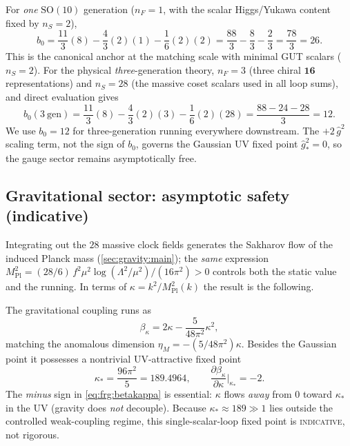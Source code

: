 \begin{remark}
\label{rem:frg:b0}
For \emph{one} $\mathrm{SO}(10)$ generation ($n_{F}=1$, with the scalar
Higgs/Yukawa content fixed by $n_{S}=2$),
\begin{equation}\label{eq:frg:b0one}
  b_{0}
  =\frac{11}{3}(8)-\frac43(2)(1)-\frac16(2)(2)
  =\frac{88}{3}-\frac{8}{3}-\frac{2}{3}
  =\frac{78}{3}=26 .
\end{equation}
This is the canonical anchor at the matching scale with minimal GUT scalars
($n_{S}=2$). For the physical \emph{three}-generation theory, $n_{F}=3$
(three chiral $\mathbf{16}$ representations) and $n_{S}=28$ (the massive
coset scalars used in all loop sums), and direct evaluation gives
\begin{equation}\label{eq:frg:b0three}
  b_{0}(3\ \text{gen})
  =\frac{11}{3}(8)-\frac43(2)(3)-\frac16(2)(28)
  =\frac{88-24-28}{3}=12 .
\end{equation}
We use $b_{0}=12$ for three-generation running everywhere downstream. The
$+2\,\hat g^{2}$ scaling term, not the sign of $b_{0}$, governs the Gaussian
UV fixed point $\hat g^{2}_{\ast}=0$, so the gauge sector remains
asymptotically free.
\end{remark}

\subsection{Gravitational sector: asymptotic safety (indicative)}
\label{sec:frg:gravity}

Integrating out the $28$ massive clock fields generates the Sakharov flow
of the induced Planck mass (\autoref{sec:gravity:main}); the \emph{same}
expression $M_{\mathrm{Pl}}^{2}=(28/6)\,f^{2}\mu^{2}\log(\Lambda^{2}/\mu^{2})/(16\pi^{2})>0$
controls both the static value and the running. In terms of
$\kappa=k^{2}/M_{\mathrm{Pl}}^{2}(k)$ the result is the following.

\begin{conjecture}
\label{conj:frg:gravity}
The gravitational coupling runs as
\begin{equation}\label{eq:frg:betakappa}
  \beta_{\kappa}=2\kappa-\frac{5}{48\pi^{2}}\kappa^{2},
\end{equation}
matching the anomalous dimension $\eta_{M}=-(5/48\pi^{2})\kappa$. Besides
the Gaussian point it possesses a nontrivial UV-attractive fixed point
\begin{equation}\label{eq:frg:kappastar}
  \kappa_{\ast}=\frac{96\pi^{2}}{5}=189.4964,
  \qquad
  \frac{\partial\beta_{\kappa}}{\partial\kappa}\bigg|_{\kappa_{\ast}}=-2 .
\end{equation}
The \emph{minus} sign in \eqref{eq:frg:betakappa} is essential: $\kappa$
flows \emph{away} from $0$ toward $\kappa_{\ast}$ in the UV (gravity does
\emph{not} decouple). Because $\kappa_{\ast}\approx189\gg1$ lies outside
the controlled weak-coupling regime, this single-scalar-loop fixed point is
\textsc{indicative}, not rigorous.
\end{conjecture}

